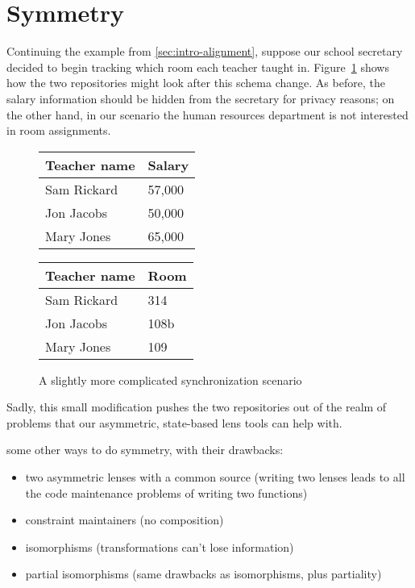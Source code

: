 
\section{Symmetry}
\label{sec:intro-symmetry}
Continuing the example from \ref{sec:intro-alignment}, suppose our school
secretary decided to begin tracking which room each teacher taught in.
Figure~\ref{fig:school-rooms} shows how the two repositories might look
after this schema change. As before, the salary information should be hidden
from the secretary for privacy reasons; on the other hand, in our scenario
the human resources department is not interested in room assignments.

\begin{figure}
    \centering
    \begin{tabular}{ll}
        Teacher name & Salary \\
        \hline
        Sam Rickard & 57,000 \\
        Jon Jacobs  & 50,000 \\
        Mary Jones  & 65,000
    \end{tabular}
    \hfil
    \begin{tabular}{ll}
        Teacher name & Room \\
        \hline
        Sam Rickard & 314 \\
        Jon Jacobs  & 108b \\
        Mary Jones  & 109
    \end{tabular}
    \caption{A slightly more complicated synchronization scenario}
    \label{fig:school-rooms}
\end{figure}

Sadly, this small modification pushes the two repositories out of the realm
of problems that our asymmetric, state-based lens tools can help with.

some other ways to do symmetry, with their drawbacks:
\begin{itemize}
    \item two asymmetric lenses with a common source (writing two lenses
        leads to all the code maintenance problems of writing two functions)
    \item constraint maintainers (no composition)
    \item isomorphisms (transformations can't lose information)
    \item partial isomorphisms (same drawbacks as isomorphisms, plus
        partiality)
\end{itemize}

